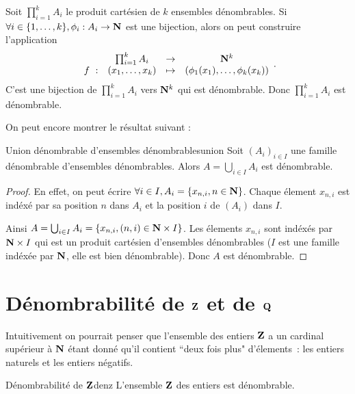 \documentclass[a4paper,french,final]{memoir}
\begin{document}
Soit $\prod_{i =1}^k A_i$ le produit cartésien de $k$ ensembles dénombrables. Si $\forall i \in \{1,\dots,k\}, \phi_i : A_i \to \NN$ est une bijection, alors on peut construire l'application \[ \begin{array}{cccc}
	\ & \prod_{i=1}^k A_i & \to & \NN^k\\
	f~: & (x_1,\dots,x_k) & \mapsto & (\phi_1(x_1),\dots, \phi_k(x_k))
	\end{array}.\]
C'est une bijection de $\prod_{i=1}^k A_i $ vers $\mathbf{N}^k$ qui est dénombrable. Donc $\prod_{i=1}^kA_i$ est dénombrable.


On peut encore montrer le résultat suivant :
\begin{theoremb}{Union dénombrable d'ensembles dénombrables}{union}
    Soit $(A_i)_{i \in I}$ une famille dénombrable d'ensembles dénombrables.
	Alors $A= \bigcup_{i \in I} A_i$ est dénombrable.
\end{theoremb}
\begin{proof}
	En effet, on peut écrire $\forall i \in I, A_i = \{x_{n,i}, n \in \mathbf{N}\}$. Chaque élement $x_{n, i}$ est indéxé par sa position $n$ dans $A_i$ et la position $i$ de $(A_i)$ dans $I$.

	Ainsi $A = \bigcup_{i \in I} A_i = \{x_{n, i}, (n,i) \in \mathbf{N} \times I\}$. Les élements $x_{n,i}$ sont indéxés par $\mathbf{N} \times I$ qui est un produit cartésien d'ensembles dénombrables ($I$ est une famille indéxée par $\mathbf{N}$, elle est bien dénombrable). Donc $A$ est dénombrable.
\end{proof}
\section{\texorpdfstring{Dénombrabilité de $\mathbf{Z}$ et de $\mathbf{Q}$}{Dénombrabilité de Z et Q}}

Intuitivement on pourrait penser que l'ensemble des entiers $\mathbf{Z}$ a un cardinal supérieur à $\mathbf{N}$ étant donné qu'il contient ``deux fois plus" d'élements~: les entiers naturels et les entiers négatifs.

\begin{theoremb}{Dénombrabilité de $\mathbf{Z}$}{denz}
	L'ensemble $\mathbf{Z}$ des entiers est dénombrable.
\end{theoremb}
\end{document}
